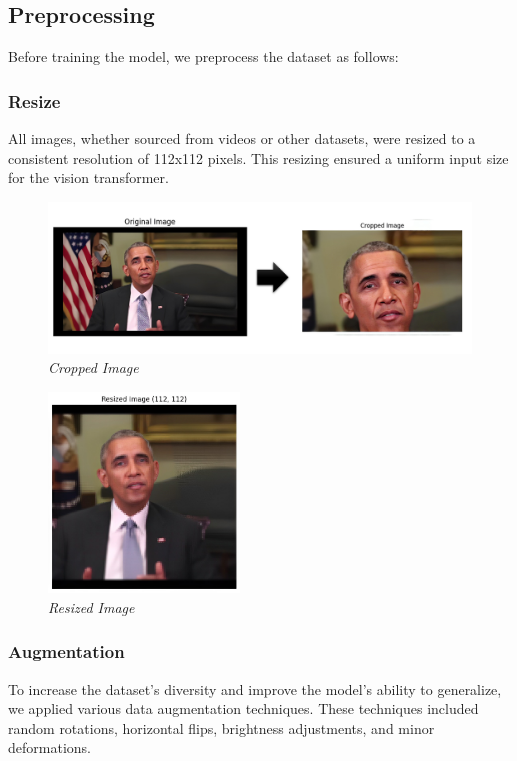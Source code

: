 \subsection{Preprocessing}

Before training the model, we preprocess the dataset as follows:

\subsubsection{Resize}
All images, whether sourced from videos or other datasets, were resized to a consistent resolution of 112x112 pixels. This resizing ensured a uniform input size for the vision transformer.

\begin{figure}[ht]
    \centering
    \includegraphics[width=5in]{img/cropped.jpg}
    \caption{\textit{Cropped Image}}
    \label{fig:cropped}
\end{figure}

\begin{figure}[ht]
    \centering
    \includegraphics[width=2in]{img/resized.jpg}
    \caption{\textit{Resized Image}}
    \label{fig:resized}
\end{figure}

\subsubsection{Augmentation} To increase the dataset's diversity and improve the model's ability to generalize, we applied various data augmentation techniques. These techniques included random rotations, horizontal flips, brightness adjustments, and minor deformations.
\newpage
